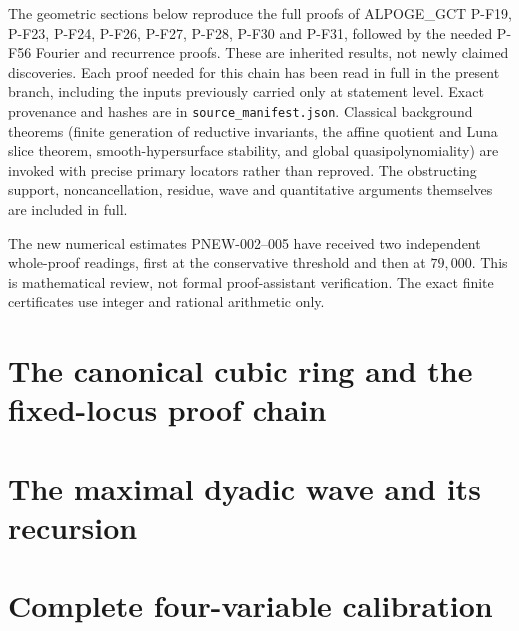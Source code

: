 \documentclass[11pt,a4paper]{article}
\begin{document}
The geometric sections below reproduce the full proofs of
ALPOGE\_GCT P-F19, P-F23, P-F24, P-F26, P-F27, P-F28,
P-F30 and P-F31, followed by the needed P-F56 Fourier and
recurrence proofs.  These are inherited results, not newly
claimed discoveries.  Each proof needed for this chain has
been read in full in the present branch, including the inputs
previously carried only at statement level.  Exact provenance
and hashes are in \texttt{source\_manifest.json}.
Classical background theorems (finite generation of reductive
invariants, the affine quotient and Luna slice theorem,
smooth-hypersurface stability, and global quasipolynomiality)
are invoked with precise primary locators rather than reproved.
The obstructing support, noncancellation, residue, wave and
quantitative arguments themselves are included in full.

The new numerical estimates PNEW-002--005 have received two
independent whole-proof readings, first at the conservative
threshold and then at $79,000$.  This is mathematical review,
not formal proof-assistant verification.  The exact finite
certificates use integer and rational arithmetic only.

\section{The canonical cubic ring and the fixed-locus proof chain}

















\section{The maximal dyadic wave and its recursion}





\section{Complete four-variable calibration}

\end{document}
